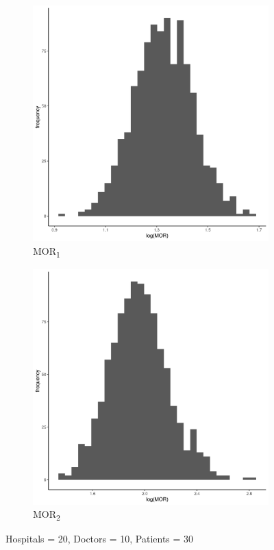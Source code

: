 \documentclass[
  letterpaper,
  DIV=11,
  numbers=noendperiod,
  titlepage]{scrartcl}
\begin{document}
\vspace{10mm}

\begin{figure}
\centering
\begin{subfigure}{.49\textwidth}
    \centering
    \includegraphics[width=.95\linewidth]{../../plots/three-lvl-ran-int/low-prev/hist_20_10_30_three_lvl_low_prev_mor1.png}  
    \caption{MOR\textsubscript{1}}
    \label{l20m10n151}
\end{subfigure}
\begin{subfigure}{.49\textwidth}
    \centering
    \includegraphics[width=.95\linewidth]{../../plots/three-lvl-ran-int/low-prev/hist_20_10_30_three_lvl_low_prev_mor2.png}  
    \caption{MOR\textsubscript{2}}
    \label{l20m10n152}
\end{subfigure}
\caption{Hospitals = 20, Doctors = 10, Patients = 30}
\label{mor1}
\end{figure}
\end{document}
